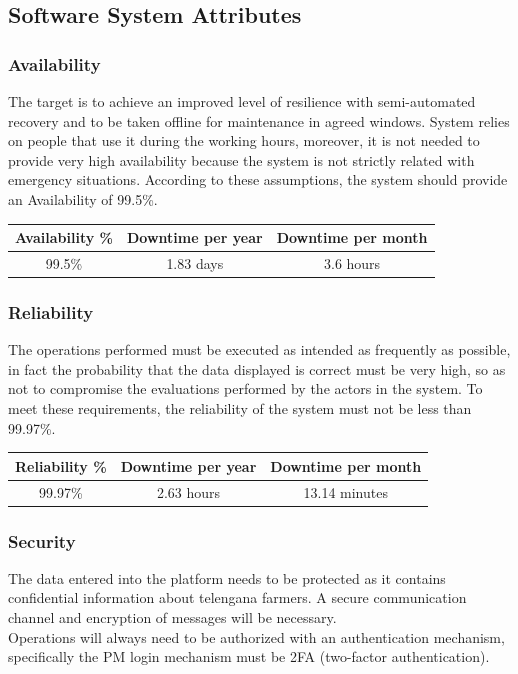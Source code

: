 \documentclass[10pt]{article}
\begin{document}
\subsection{Software System Attributes}
\subsubsection{Availability}
The target is to achieve an improved level of resilience with semi-automated recovery and to be taken offline for maintenance in agreed windows.
System relies on people that use it during the working hours, moreover, it is not needed to provide very high availability because the system is not strictly related with emergency situations.
According to these assumptions, the system should provide an Availability of 99.5\%.
\begin{center}
    \begin{tabular}{|c c c|} 
    \hline
    Availability \% & Downtime per year & Downtime per month\\ 
    \hline
    99.5\%  & 1.83 days & 3.6 hours\\ 
    \hline
    \end{tabular}
\end{center}
\subsubsection{Reliability}
The operations performed must be executed as intended as frequently as possible, in fact the probability that the data displayed is correct must be 
very high, so as not to compromise the evaluations performed by the actors in the system. To meet these requirements, the reliability of the system must 
not be less than 99.97\%.
\begin{center}
    \begin{tabular}{|c c c|} 
    \hline
    Reliability \% & Downtime per year & Downtime per month\\ 
    \hline
    99.97\%  & 2.63 hours & 13.14 minutes\\ 
    \hline
    \end{tabular}
\end{center}
\subsubsection{Security}
The data entered into the platform needs to be protected as it contains confidential information about telengana farmers. A secure communication channel and encryption of messages will be necessary.\\
Operations will always need to be authorized with an authentication mechanism, specifically the PM login mechanism must be 2FA (two-factor authentication).
\end{document}

